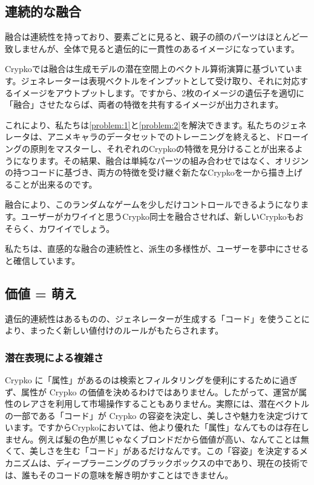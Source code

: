 \documentclass[xelatex,ja=standard]{bxjsarticle}
\begin{document}
\subsection{連続的な融合}
融合は連続性を持っており、要素ごとに見ると、親子の顔のパーツはほとんど一致しませんが、全体で見ると遺伝的に一貫性のあるイメージになっています。

Crypkoでは融合は生成モデルの潜在空間上のベクトル算術演算\cite{radford2015unsupervised}に基づいています。ジェネレーターは表現ベクトルをインプットとして受け取り、それに対応するイメージをアウトプットします。ですから、2枚のイメージの遺伝子を適切に「融合」させたならば、両者の特徴を共有するイメージが出力されます。

これにより、私たちは\ref{problem:1}と\ref{problem:2}を解決できます。私たちのジェネレータは、アニメキャラのデータセットでのトレーニングを終えると、ドローイングの原則をマスターし、それぞれのCrypkoの特徴を見分けることが出来るようになります。その結果、融合は単純なパーツの組み合わせではなく、オリジンの持つコードに基づき、両方の特徴を受け継ぐ新たなCrypkoを一から描き上げることが出来るのです。

融合により、このランダムなゲームを少しだけコントロールできるようになります。ユーザーがカワイイと思うCrypko同士を融合させれば、新しいCrypkoもおそらく、カワイイでしょう。

私たちは、直感的な融合の連続性と、派生の多様性が、ユーザーを夢中にさせると確信しています。

\subsection{価値 = 萌え}

遺伝的連続性はあるものの、ジェネレーターが生成する「コード」を使うことにより、まったく新しい値付けのルールがもたらされます。

\subsubsection{潜在表現による複雑さ}

Crypko に「属性」があるのは検索とフィルタリングを便利にするために過ぎず、属性が Crypko の価値を決めるわけではありません。したがって、運営が属性のレアさを利用して市場操作することもありません。実際には、潜在ベクトルの一部である「コード」が Crypko の容姿を決定し、美しさや魅力を決定づけています。ですからCrypkoにおいては、他より優れた「属性」なんてものは存在しません。例えば髪の色が黒じゃなくブロンドだから価値が高い、なんてことは無くて、美しさを生む「コード」があるだけなんです。この「容姿」を決定するメカニズムは、ディープラーニングのブラックボックスの中であり、現在の技術では、誰もそのコードの意味を解き明かすことはできません。
\end{document}

